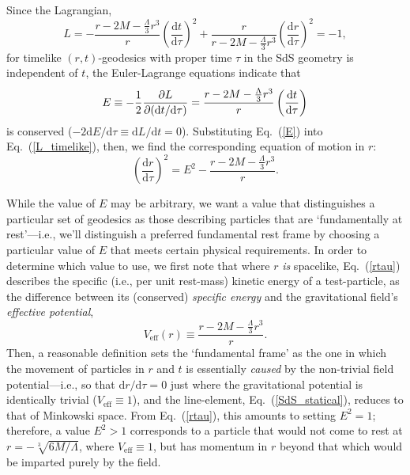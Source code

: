 \documentclass[11pt]{article}
\begin{document}
\begin{appendix}
Since the Lagrangian, 
\begin{equation}
L=-\frac{r-2M-\frac{\Lambda}{3}r^3}{r}\left(\frac{\mathrm{d}t}{\mathrm{d}\tau}\right)^2+\frac{r}{r-2M-\frac{\Lambda}{3}r^3}\left(\frac{\mathrm{d}r}{\mathrm{d}\tau}\right)^2=-1,\label{L_timelike}
\end{equation}
for timelike $(r,t)$-geodesics with proper time $\tau$ in the SdS geometry is independent of $t$, the Euler-Lagrange equations indicate that
\begin{equation}
E\equiv-{1 \over 2}{\partial{L} \over \partial(\mathrm{d}t/\mathrm{d}\tau)}=\frac{r-2M-\frac{\Lambda}{3}r^3}{r}\left(\frac{\mathrm{d}t}{\mathrm{d}\tau}\right)\label{E}
\end{equation}
is conserved ($-2\mathrm{d}E/\mathrm{d}\tau\equiv\mathrm{d}L/\mathrm{d}t=0$). Substituting Eq.~(\ref{E}) into Eq.~(\ref{L_timelike}), then, we find the corresponding equation of motion in $r$:
\begin{equation}
\left(\frac{\mathrm{d}r}{\mathrm{d}\tau}\right)^2=E^2-\frac{r-2M-\frac{\Lambda}{3}r^3}{r}.\label{rtau}
\end{equation}

While the value of $E$ may be arbitrary, we want a value that distinguishes a particular set of geodesics as those describing particles that are `fundamentally at rest'---i.e., we'll distinguish a preferred fundamental rest frame by choosing a particular value of $E$ that meets certain physical requirements. In order to determine which value to use, we first note that where $r$ \textit{is} spacelike, Eq.~(\ref{rtau}) describes the specific (i.e., per unit rest-mass) kinetic energy of a test-particle, as the difference between its (conserved) \textit{specific energy} and the gravitational field's \textit{effective potential},
\begin{equation}
V_{\mathrm{eff}}(r)\equiv\frac{r-2M-\frac{\Lambda}{3}r^3}{r}.\label{V_eff}
\end{equation} 
Then, a reasonable definition sets the `fundamental frame' as the one in which the movement of particles in $r$ and $t$ is essentially \textit{caused} by the non-trivial field potential---i.e., so that $\mathrm{d}r/\mathrm{d}\tau=0$ just where the gravitational potential is identically trivial ($V_{\mathrm{eff}}\equiv1$), and the line-element, Eq.~(\ref{SdS_statical}), reduces to that of Minkowski space. From Eq.~(\ref{rtau}), this amounts to setting $E^2=1$; therefore, a value $E^2>1$ corresponds to a particle that would not come to rest at $r=-\sqrt[3]{6M/\Lambda}$, where $V_{\mathrm{eff}}\equiv1$, but has momentum in $r$ beyond that which would be imparted purely by the field.


\end{appendix}
\end{document}
